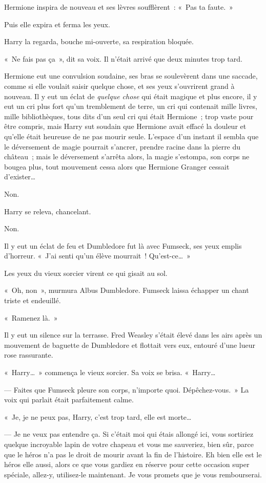 Hermione inspira de nouveau et ses lèvres soufflèrent~: «~Pas ta faute.~»

Puis elle expira et ferma les yeux.

Harry la regarda, bouche mi-ouverte, sa respiration bloquée.

«~Ne fais pas ça~», dit sa voix. Il n'était arrivé que deux minutes trop tard.

Hermione eut une convulsion soudaine, ses bras se soulevèrent dans une saccade, comme si elle voulait saisir quelque chose, et ses yeux s'ouvrirent grand à nouveau. Il y eut un éclat de \emph{quelque chose} qui était magique et plus encore, il y eut un cri plus fort qu'un tremblement de terre, un cri qui contenait mille livres, mille bibliothèques, tous dits d'un seul cri qui était Hermione~; trop vaste pour être compris, mais Harry sut soudain que Hermione avait effacé la douleur et qu'elle était heureuse de ne pas mourir seule. L'espace d'un instant il sembla que le déversement de magie pourrait s'ancrer, prendre racine dans la pierre du château~; mais le déversement s'arrêta alors, la magie s'estompa, son corps ne bougea plus, tout mouvement cessa alors que Hermione Granger cessait d'exister…

Non.

Harry se releva, chancelant.

Non.

Il y eut un éclat de feu et Dumbledore fut là avec Fumseck, ses yeux emplis d'horreur. «~J'ai senti qu'un élève mourrait~! Qu'est-ce…~»

Les yeux du vieux sorcier virent ce qui gisait au sol.

«~Oh, non~», murmura Albus Dumbledore. Fumseck laissa échapper un chant triste et endeuillé.

«~Ramenez là.~»

Il y eut un silence sur la terrasse. Fred Weasley s'était élevé dans les airs après un mouvement de baguette de Dumbledore et flottait vers eux, entouré d'une lueur rose rassurante.

«~Harry…~» commença le vieux sorcier. Sa voix se brisa. «~Harry…

--- Faites que Fumseck pleure son corps, n'importe quoi. Dépêchez-vous.~» La voix qui parlait était parfaitement calme.

«~Je, je ne peux pas, Harry, c'est trop tard, elle est morte…

--- Je ne veux pas entendre ça. Si c'était moi qui étais allongé ici, vous sortiriez quelque incroyable lapin de votre chapeau et vous me sauveriez, bien sûr, parce que le héros n'a pas le droit de mourir avant la fin de l'histoire. Eh bien elle est le héros elle aussi, alors ce que vous gardiez en réserve pour cette occasion super spéciale, allez-y, utilisez-le maintenant. Je vous promets que je vous rembourserai.

